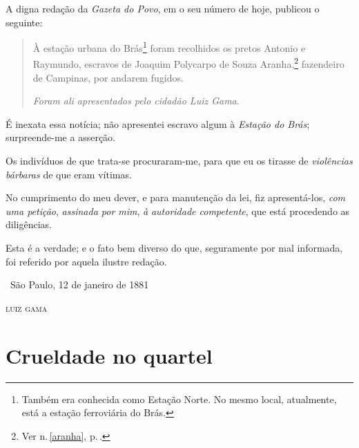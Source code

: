 A digna redação da \emph{Gazeta do Povo}, em o seu número de hoje,
publicou o seguinte:

\begin{quote}
À estação urbana do Brás\footnote{Também era conhecida como Estação
  Norte. No mesmo local, atualmente, está a estação ferroviária do
  Brás.} foram recolhidos os pretos Antonio e Raymundo, escravos de
Joaquim Polycarpo de Souza Aranha,\footnote{Ver n.\,\ref{aranha}, p.\,\pageref{aranha}.}
fazendeiro de Campinas, por andarem fugidos.

\emph{Foram ali apresentados pelo cidadão Luiz Gama}.
\end{quote}

É inexata essa notícia; não apresentei escravo algum à \emph{Estação do
Brás}; surpreende-me a asserção.

Os indivíduos de que trata-se procuraram-me, para que eu os tirasse de
\emph{violências bárbaras} de que eram vítimas.

No cumprimento do meu dever, e para manutenção da lei, fiz
apresentá-los, \emph{com uma petição}, \emph{assinada por mim}, \emph{à}
\emph{autoridade competente}, que está procedendo as diligências.

Esta é a verdade; e o fato bem diverso do que, seguramente por mal
informada, foi referido por aquela ilustre redação.

\medskip

\hfill\ São Paulo, 12 de janeiro de 1881

\hfill\textsc{luiz gama}

\part{Crueldade no quartel}

